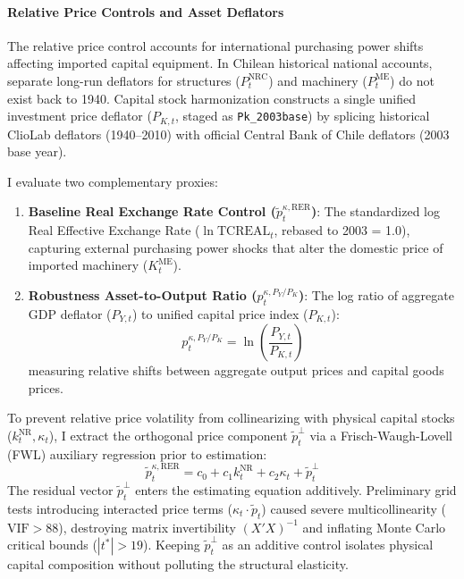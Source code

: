 \paragraph{Relative Price Controls and Asset Deflators}
The relative price control accounts for international purchasing power shifts affecting imported capital equipment. In Chilean historical national accounts, separate long-run deflators for structures ($P_t^{\text{NRC}}$) and machinery ($P_t^{\text{ME}}$) do not exist back to 1940. Capital stock harmonization constructs a single unified investment price deflator ($P_{K,t}$, staged as \texttt{Pk\_2003base}) by splicing historical ClioLab deflators (1940--2010) with official Central Bank of Chile deflators (2003 base year).

I evaluate two complementary proxies:
\begin{enumerate}
	\item \textbf{Baseline Real Exchange Rate Control ($\tilde{p}_t^{\kappa, \text{RER}}$)}: The standardized log Real Effective Exchange Rate ($\ln\text{TCREAL}_t$, rebased to 2003 = 1.0), capturing external purchasing power shocks that alter the domestic price of imported machinery ($K_t^{\text{ME}}$).
	\item \textbf{Robustness Asset-to-Output Ratio ($p_t^{\kappa, P_Y/P_K}$)}: The log ratio of aggregate GDP deflator ($P_{Y,t}$) to unified capital price index ($P_{K,t}$):
	\begin{equation}
		p_t^{\kappa, P_Y/P_K} = \ln\left(\frac{P_{Y,t}}{P_{K,t}}\right)
	\end{equation}
	measuring relative shifts between aggregate output prices and capital goods prices.
\end{enumerate}

To prevent relative price volatility from collinearizing with physical capital stocks ($k_t^{\text{NR}}, \kappa_t$), I extract the orthogonal price component $\tilde{p}_t^\perp$ via a Frisch-Waugh-Lovell (FWL) auxiliary regression prior to estimation:
\begin{equation}
	\tilde{p}_t^{\kappa, \text{RER}} = c_0 + c_1 k_t^{\text{NR}} + c_2 \kappa_t + \tilde{p}_t^\perp
\end{equation}
The residual vector $\tilde{p}_t^\perp$ enters the estimating equation additively. Preliminary grid tests introducing interacted price terms ($\kappa_t \cdot \tilde{p}_t$) caused severe multicollinearity ($\text{VIF} > 88$), destroying matrix invertibility $(X'X)^{-1}$ and inflating Monte Carlo critical bounds ($|t^*| > 19$). Keeping $\tilde{p}_t^\perp$ as an additive control isolates physical capital composition without polluting the structural elasticity.

